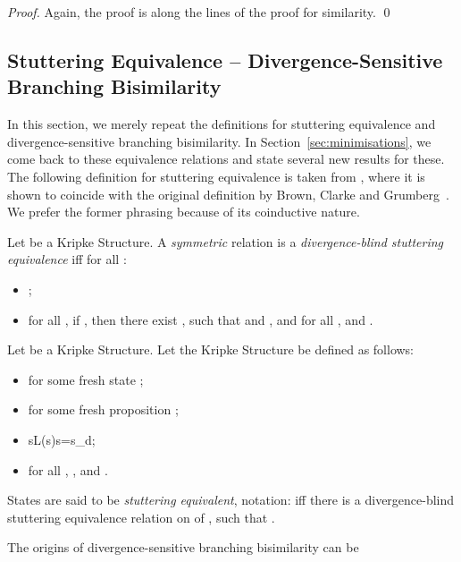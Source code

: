 \documentclass{llncs}
\begin{document}
\begin{proof} Again, the proof is along the lines of the proof for
similarity. \qed
\end{proof}


\subsection{Stuttering Equivalence -- Divergence-Sensitive Branching
Bisimilarity}
\label{sec:stuttering}

In this section, we merely repeat the definitions for stuttering
equivalence and divergence-sensitive branching bisimilarity. In
Section~\ref{sec:minimisations}, we come back to these equivalence
relations and state several new results for these.\\

The following definition for stuttering equivalence is taken
from \cite{DBLP:journals/jacm/NicolaV95}, where it is shown to coincide
with the original definition by Brown, Clarke and Grumberg~\cite{DBLP:journals/tcs/BrowneCG88}.
We prefer the former phrasing because of its coinductive nature.
\begin{definition}
Let  be a Kripke Structure. A
\emph{symmetric} relation  is a
\emph{divergence-blind stuttering equivalence} iff for all :
\begin{itemize}
\item ;
\item for all , if , then there exist
, such that  and , and
for all ,  and .
\end{itemize}
\end{definition}
\begin{definition} Let  be a Kripke
Structure. Let the Kripke Structure  be defined as follows:
\begin{itemize}
\item  for some fresh state ;

\item  for some fresh proposition ;

\item sL(s)s=s_d;

\item for all , , and .

\end{itemize}
States  are said to be \emph{stuttering equivalent},
notation:  iff there is a divergence-blind
stuttering equivalence relation  on  of , such that
.
\end{definition}
The origins of divergence-sensitive branching bisimilarity can be
\end{document}
